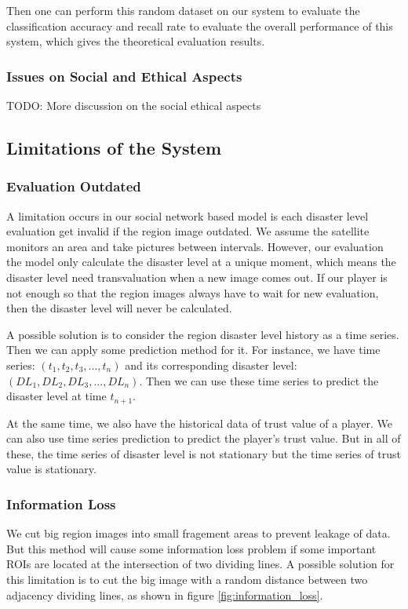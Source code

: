 Then one can perform this random dataset on our system to evaluate the classification accuracy and recall rate to
evaluate the overall performance of this system, which gives the theoretical evaluation results.

\subsubsection{Issues on Social and Ethical Aspects}

TODO: More discussion on the social ethical aspects

\subsection{Limitations of the System}

\subsubsection{Evaluation Outdated}

A limitation occurs in our social network based model is each disaster level evaluation get invalid 
if the region image outdated. 
We assume the satellite monitors an area and take pictures between intervals. However, our evaluation
the model only calculate the disaster level at a unique moment, which means the disaster level need 
transvaluation when a new image comes out.
If our player is not enough so that the region images always have to wait for new evaluation, then the
disaster level will never be calculated.

A possible solution is to consider the region disaster level history as a time series. Then we can apply
some prediction method for it. For instance, we have time series: $(t_1, t_2, t_3, ..., t_n)$
and its corresponding disaster level: $(DL_1, DL_2, DL_3, ..., DL_n)$.
Then we can use these time series to predict the disaster level at time $t_{n+1}$.

At the same time, we also have the historical data of trust value of a player. We can also
use time series prediction to predict the player's trust value. But in all of these, the time series
of disaster level is not stationary but the time series of trust value is stationary.

\subsubsection{Information Loss}
We cut big region images into small fragement areas to prevent leakage of data. 
But this method will cause some information loss problem if some important ROIs are 
located at the intersection of two dividing lines.
A possible solution for this limitation is to cut the big image with a random distance 
between two adjacency dividing lines, as shown in figure \ref{fig:information_loss}.

